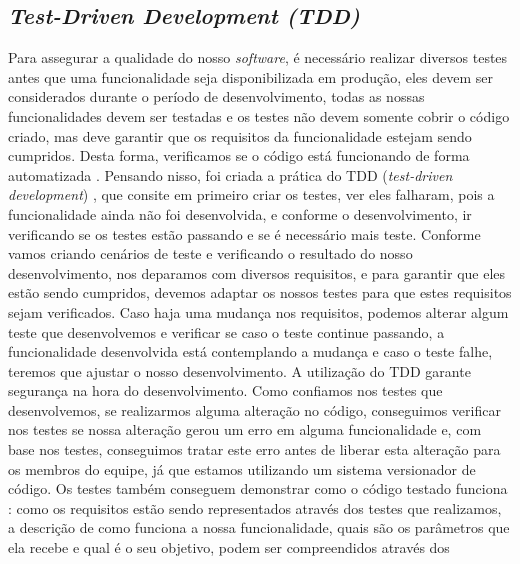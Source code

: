       \subsection{\textit{Test-Driven Development (TDD)}}
        Para assegurar a qualidade do nosso \textit{software}, é necessário realizar
        diversos testes antes que uma funcionalidade seja disponibilizada em produção,
        eles devem ser considerados durante o período de desenvolvimento, todas
        as nossas funcionalidades devem ser testadas e os testes não devem somente
        cobrir o código criado, mas deve garantir que os requisitos da funcionalidade
        estejam sendo cumpridos. Desta forma, verificamos se o código está funcionando
        de forma automatizada \cite{CleanCode}. \newline
        Pensando nisso, foi criada a prática do TDD (\textit{test-driven development})
        \cite{TestDrivenDevelopment}, que consite em primeiro criar os testes, ver
        eles falharam, pois a funcionalidade ainda não foi desenvolvida, e conforme
        o desenvolvimento, ir verificando se os testes estão passando e se é necessário
        mais teste. Conforme vamos criando cenários de teste e verificando o resultado
        do nosso desenvolvimento, nos deparamos com diversos requisitos, e para
        garantir que eles estão sendo cumpridos, devemos adaptar os nossos testes para
        que estes requisitos sejam verificados. Caso haja uma mudança nos requisitos,
        podemos alterar algum teste que desenvolvemos e verificar se caso o teste
        continue passando, a funcionalidade desenvolvida está contemplando a mudança
        e caso o teste falhe, teremos que ajustar o nosso desenvolvimento. \newline
        A utilização do TDD garante segurança na hora do desenvolvimento. Como
        confiamos nos testes que desenvolvemos, se realizarmos alguma alteração
        no código, conseguimos verificar nos testes se nossa alteração gerou um
        erro em alguma funcionalidade e, com base nos testes, conseguimos tratar
        este erro antes de liberar esta alteração para os membros do equipe, já
        que estamos utilizando um sistema versionador de código. Os testes também
        conseguem demonstrar como o código testado funciona \cite{martin2007agile}:
        como os requisitos estão sendo representados através dos testes que realizamos,
        a descrição de como funciona a nossa funcionalidade, quais são os parâmetros
        que ela recebe e qual é o seu objetivo, podem ser compreendidos através dos
